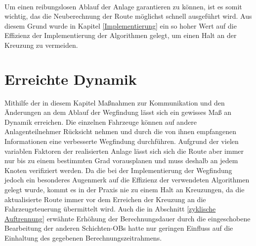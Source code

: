 		\\
		Um einen reibungslosen Ablauf der Anlage garantieren zu können, ist es somit wichtig, das die Neuberechnung der Route möglichst schnell ausgeführt wird. Aus diesem Grund wurde in Kapitel \ref{Implementierung} ein so hoher Wert auf die Effizienz der Implementierung der Algorithmen gelegt, um einen Halt an der Kreuzung zu vermeiden.
		
\section{Erreichte Dynamik}
	
	Mithilfe der in diesem Kapitel Maßnahmen zur Kommunikation und den Änderungen an dem Ablauf der Wegfindung lässt sich ein gewisses Maß an Dynamik erreichen. Die einzelnen Fahrzeuge können auf andere Anlagenteilnehmer Rücksicht nehmen und durch die von ihnen empfangenen Informationen eine verbesserte Wegfindung durchführen. Aufgrund der vielen variablen Faktoren der realisierten Anlage lässt sich sich die Route aber immer nur bis zu einem bestimmten Grad vorausplanen und muss deshalb an jedem Knoten verifiziert werden. Da die bei der Implementierung der Wegfindung jedoch ein besonderes Augenmerk auf die Effizienz der verwendeten Algorithmen gelegt wurde, kommt es in der Praxis nie zu einem Halt an Kreuzungen, da die aktualisierte Route immer vor dem Erreichen der Kreuzung an die Fahrzeugsteuerung übermittelt wird. Auch die in Abschnitt \ref{zyklische Auftrennung} erwähnte Erhöhung der Berechnungsdauer durch die eingeschobene Bearbeitung der anderen Schichten-\ac{OB}s hatte nur geringen Einfluss auf die Einhaltung des gegebenen Berechnungszeitrahmens.
